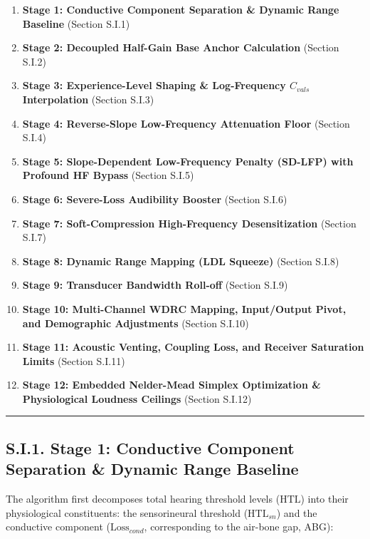 \documentclass[
  12pt,
]{article}
\providecommand{\tightlist}{%
  \setlength{\itemsep}{0pt}\setlength{\parskip}{0pt}}
\begin{document}
\begin{enumerate}
\def\labelenumi{\arabic{enumi}.}
\tightlist
\item
  \textbf{Stage 1: Conductive Component Separation \& Dynamic Range
  Baseline} (Section S.I.1)
\item
  \textbf{Stage 2: Decoupled Half-Gain Base Anchor Calculation} (Section
  S.I.2)
\item
  \textbf{Stage 3: Experience-Level Shaping \& Log-Frequency
  \(C_{vals}\) Interpolation} (Section S.I.3)
\item
  \textbf{Stage 4: Reverse-Slope Low-Frequency Attenuation Floor}
  (Section S.I.4)
\item
  \textbf{Stage 5: Slope-Dependent Low-Frequency Penalty (SD-LFP) with
  Profound HF Bypass} (Section S.I.5)
\item
  \textbf{Stage 6: Severe-Loss Audibility Booster} (Section S.I.6)
\item
  \textbf{Stage 7: Soft-Compression High-Frequency Desensitization}
  (Section S.I.7)
\item
  \textbf{Stage 8: Dynamic Range Mapping (LDL Squeeze)} (Section S.I.8)
\item
  \textbf{Stage 9: Transducer Bandwidth Roll-off} (Section S.I.9)
\item
  \textbf{Stage 10: Multi-Channel WDRC Mapping, Input/Output Pivot, and
  Demographic Adjustments} (Section S.I.10)
\item
  \textbf{Stage 11: Acoustic Venting, Coupling Loss, and Receiver
  Saturation Limits} (Section S.I.11)
\item
  \textbf{Stage 12: Embedded Nelder-Mead Simplex Optimization \&
  Physiological Loudness Ceilings} (Section S.I.12)
\end{enumerate}

\begin{center}\rule{0.5\linewidth}{0.5pt}\end{center}

\subsection{S.I.1. Stage 1: Conductive Component Separation \& Dynamic
Range
Baseline}\label{s.i.1.-stage-1-conductive-component-separation-dynamic-range-baseline}

The algorithm first decomposes total hearing threshold levels
(\(\text{HTL}\)) into their physiological constituents: the
sensorineural threshold (\(\text{HTL}_{sn}\)) and the conductive
component (\(\text{Loss}_{cond}\), corresponding to the air-bone gap,
ABG):
\end{document}
